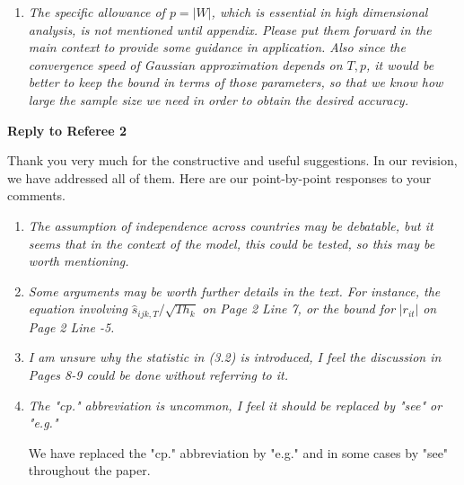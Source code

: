 \documentclass[a4paper,12pt]{article}
\begin{document}
\begin{enumerate}[label=(\arabic*),leftmargin=0.7cm]
\begin{enumerate}[label=(\roman*)]
It can indeed be proven that our multiscale test has asymptotic power $1$ against local alternatives. We have added this result as Corollary A.2 in the Appendix to the paper. The proof is provided in the Supplementary Material.

\item \textit{The argument about no need for time dependent data is reasonable, just a short comment: there already exists result extending chenozukov et al's GA to time dependent case, maybe this paper can be further extended to time dependent data as well.}
\end{enumerate}

\item \textit{The specific allowance of $p = |W|$, which is essential in high dimensional analysis, is not mentioned until appendix. Please put them forward in the main context to provide some guidance in application. Also since the convergence speed of Gaussian approximation depends on $T, p$, it would be better to keep the bound in terms of those parameters, so that we know how large the sample size we need in order to obtain the desired accuracy.}

\end{enumerate}



\newpage
\begin{center}
{\large \bf Reply to Referee 2} 
\end{center}


Thank you very much for the constructive and useful suggestions. In our revision, we have addressed all of them. Here are our point-by-point responses to your comments. 


\begin{enumerate}[label=(\arabic*),leftmargin=0.7cm]

\item \textit{The assumption of independence across countries may be debatable, but it seems that in the context of the model, this could be tested, so this may be worth mentioning.}

\item \textit{Some arguments may be worth further details in the text. For instance, the equation involving} $\widehat{s}_{ijk,T} / \sqrt{T h_k}$ \textit{on Page 2 Line 7, or the bound for} $|r_{it}|$ \textit{on Page 2 Line -5.}

\item \textit{I am unsure why the statistic in (3.2) is introduced, I feel the discussion in Pages 8-9 could be done without referring to it.}

\item \textit{The "cp." abbreviation is uncommon, I feel it should be replaced by "see" or "e.g."}

We have replaced the "cp." abbreviation by "e.g." and in some cases by "see" throughout the paper.
 

\end{enumerate}



\newpage

{\small
\setlength{\bibsep}{0.45em}
}
\end{document}
